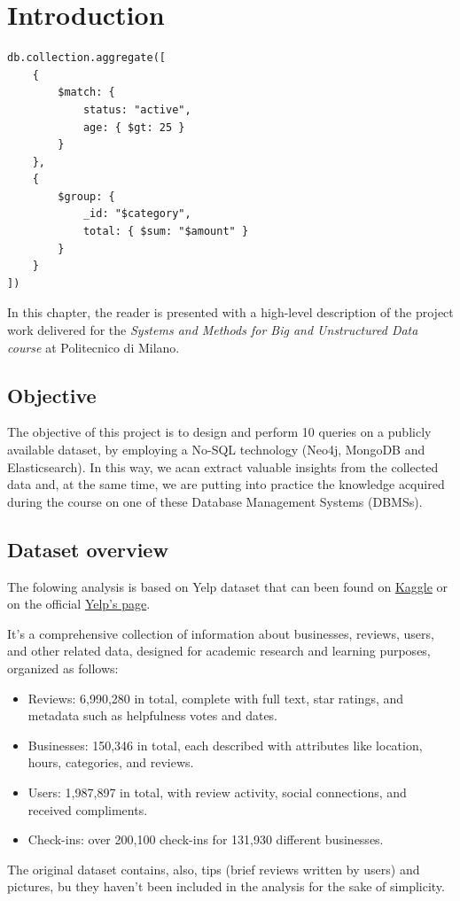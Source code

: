 \documentclass{Configuration_Files/PoliMi3i_thesis}
\begin{document}
\mainmatter %

\chapter{Introduction}
\label{ch:chapter_one}
\begin{lstlisting}[style=mongodb]
db.collection.aggregate([
    {
        $match: {
            status: "active",
            age: { $gt: 25 }
        }
    },
    {
        $group: {
            _id: "$category",
            total: { $sum: "$amount" }
        }
    }
])
\end{lstlisting}
In this chapter, the reader is presented with a high-level description of the project work delivered for the \textit{Systems and
Methods for Big and Unstructured Data course} at Politecnico di Milano.

\section{Objective}
\label{sec:Objective}
The objective of this project is to design and perform 10 queries on a publicly available dataset, by employing a No-SQL technology (Neo4j, MongoDB and Elasticsearch). In this way, we acan extract valuable insights from the collected data and, at the same time, we are putting into practice the knowledge acquired during the course on one of these Database Management Systems (DBMSs).

\section{Dataset overview}
The folowing analysis is based on Yelp dataset that can been found on \href{https://www.kaggle.com/datasets/yelp-dataset/yelp-dataset}{Kaggle} or on the official \href{https://www.yelp.com/dataset}{Yelp's page}. 

It's a comprehensive collection of information about businesses, reviews, users, and other related data, designed for academic research and learning purposes, organized as follows:
\begin{itemize}
    \item{Reviews}: 6,990,280 in total, complete with full text, star ratings, and metadata such as helpfulness votes and dates.
    \item{Businesses}: 150,346 in total, each described with attributes like location, hours, categories, and reviews.
    \item{Users}: 1,987,897 in total, with review activity, social connections, and received compliments.
    \item{Check-ins}: over 200,100 check-ins for 131,930 different businesses.
\end{itemize}
The original dataset contains, also, tips (brief reviews written by users) and pictures, bu they haven't  been included in the analysis for the sake of simplicity. 
\end{document}
